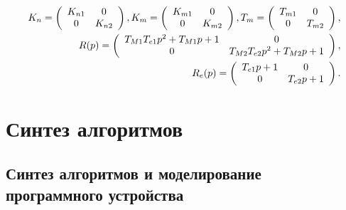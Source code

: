 \begin{equation}
\label{eq:p4:s3.10}
\begin{aligned}
K_n = \left( \begin{array}{c c}
K_{n1} & 0 \\
0 & K_{n2}
\end{array}\right),
K_m = \left( \begin{array}{c c}
K_{m1} & 0 \\
0 & K_{m2}
\end{array}\right), 
T_m = \left( \begin{array}{c c}
T_{m1} & 0 \\
0 & T_{m2}
\end{array}\right), \\
R(p) = \left( \begin{array}{c c}
T_{M1} T_{e1} p^2 + T_{M1} p +1 & 0 \\
0 & T_{M2} T_{e2} p^2 + T_{M2} p +1
\end{array}\right), \\
R_e(p) = \left( \begin{array}{c c}
T_{e1} p + 1 & 0 \\
0 & T_{e2} p + 1
\end{array}\right).
\end{aligned}
\end{equation}

\begin{comment}
\subsection{Уравнения движения привода по азимуту} \label{subsec:ch4/sect3/sub1}

Линеаризованные уравнения движения азимутального привода совместно с объектом управления запишутся [29] [30] [31] [32] [33] [34]:

\subsection{Уравнения движения привода по углу места} \label{subsec:ch4/sect3/sub2}
\end{comment}

\section{Синтез алгоритмов} \label{ch:ch4/synthesis}

\subsection{Синтез алгоритмов и моделирование программного устройства} \label{ch:ch4/sect2+}

